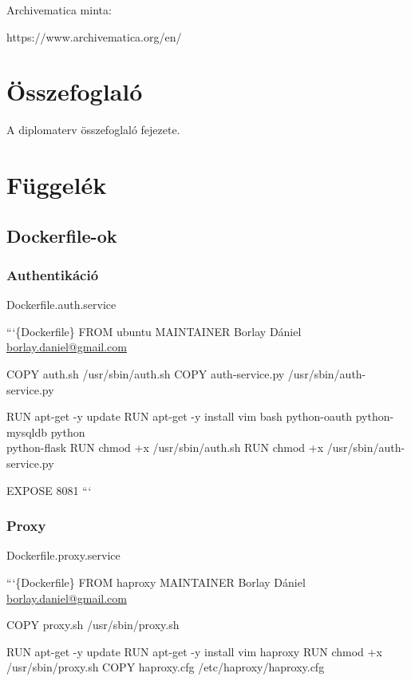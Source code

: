 \documentclass[11pt,magyar,a4paper,oneside,]{report}
\begin{document}
Archivematica minta:

https://www.archivematica.org/en/

\chapter{Összefoglaló}\label{uxf6sszefoglaluxf3}

A diplomaterv összefoglaló fejezete.

\listoftables
\listoffigures




\appendix

\chapter{Függelék}\label{fuxfcggeluxe9k}

\section{Dockerfile-ok}\label{dockerfile-ok}

\subsection{Authentikáció}\label{authentikuxe1ciuxf3}

Dockerfile.auth.service

```\{Dockerfile\} FROM ubuntu MAINTAINER Borlay Dániel
\href{mailto:borlay.daniel@gmail.com}{borlay.daniel@gmail.com}

COPY auth.sh /usr/sbin/auth.sh COPY auth-service.py
/usr/sbin/auth-service.py

RUN apt-get -y update RUN apt-get -y install vim bash python-oauth
python-mysqldb python\\ python-flask RUN chmod +x /usr/sbin/auth.sh RUN
chmod +x /usr/sbin/auth-service.py

EXPOSE 8081 ```

\subsection{Proxy}\label{proxy}

Dockerfile.proxy.service

```\{Dockerfile\} FROM haproxy MAINTAINER Borlay Dániel
\href{mailto:borlay.daniel@gmail.com}{borlay.daniel@gmail.com}

COPY proxy.sh /usr/sbin/proxy.sh

RUN apt-get -y update RUN apt-get -y install vim haproxy RUN chmod +x
/usr/sbin/proxy.sh COPY haproxy.cfg /etc/haproxy/haproxy.cfg
\end{document}
